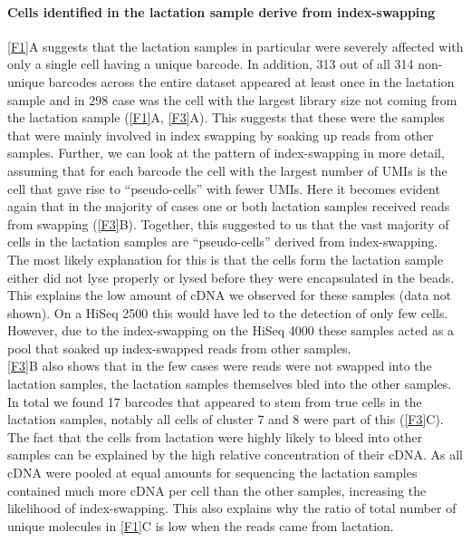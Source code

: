 \documentclass{article}
\begin{document}
\paragraph{Cells identified in the lactation sample derive from index-swapping}
\autoref{F1}A suggests that the lactation samples in particular were severely affected with only a single cell having a unique barcode.
In addition, 313 out of all 314 non-unique barcodes across the entire dataset appeared at least once in the lactation sample and in 298 case was the cell with the largest library size not coming from the lactation sample (\autoref{F1}A, \autoref{F3}A).
This suggests that these were the samples that were mainly involved in index swapping by soaking up reads from other samples.
Further, we can look at the pattern of index-swapping in more detail, assuming that for each barcode the cell with the largest number of UMIs is the cell that gave rise to ``pseudo-cells'' with fewer UMIs.
Here it becomes evident again that in the majority of cases one or both lactation samples received reads from swapping (\autoref{F3}B).
Together, this suggested to us that the vast majority of cells in the lactation samples are ``pseudo-cells'' derived from index-swapping.
The most likely explanation for this is that the cells form the lactation sample either did not lyse properly or lysed before they were encapsulated in the beads.
This explains the low amount of cDNA we observed for these samples (data not shown).
On a HiSeq 2500 this would have led to the detection of only few cells.
However, due to the index-swapping on the HiSeq 4000 these samples acted as a pool that soaked up index-swapped reads from other samples.\\
\autoref{F3}B also shows that in the few cases were reads were not swapped into the lactation samples, the lactation samples themselves bled into the other samples.
In total we found 17 barcodes that appeared to stem from true cells in the lactation samples, notably all cells of cluster 7 and 8 were part of this (\autoref{F3}C).
The fact that the cells from lactation were highly likely to bleed into other samples can be explained by the high relative concentration of their cDNA.
As all cDNA were pooled at equal amounts for sequencing the lactation samples contained much more cDNA per cell than the other samples, increasing the likelihood of index-swapping.
This also explains why the ratio of total number of unique molecules in \autoref{F1}C is low when the reads came from lactation.\\
\end{document}
